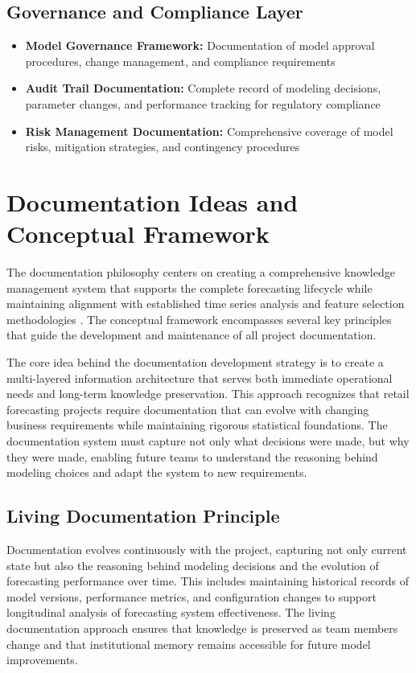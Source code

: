 \subsection{Governance and Compliance Layer}
\begin{itemize}
	\item \textbf{Model Governance Framework:} Documentation of model approval procedures, change management, and compliance requirements
	\item \textbf{Audit Trail Documentation:} Complete record of modeling decisions, parameter changes, and performance tracking for regulatory compliance
	\item \textbf{Risk Management Documentation:} Comprehensive coverage of model risks, mitigation strategies, and contingency procedures
\end{itemize}

\section{Documentation Ideas and Conceptual Framework}

The documentation philosophy centers on creating a comprehensive knowledge management system that supports the complete forecasting lifecycle while maintaining alignment with established time series analysis and feature selection methodologies \cite{Montgomery:2008}\cite{Guyon:2003}. The conceptual framework encompasses several key principles that guide the development and maintenance of all project documentation.

The core idea behind the documentation development strategy is to create a multi-layered information architecture that serves both immediate operational needs and long-term knowledge preservation. This approach recognizes that retail forecasting projects require documentation that can evolve with changing business requirements while maintaining rigorous statistical foundations. The documentation system must capture not only what decisions were made, but why they were made, enabling future teams to understand the reasoning behind modeling choices and adapt the system to new requirements.

\subsection{Living Documentation Principle}
Documentation evolves continuously with the project, capturing not only current state but also the reasoning behind modeling decisions and the evolution of forecasting performance over time. This includes maintaining historical records of model versions, performance metrics, and configuration changes to support longitudinal analysis of forecasting system effectiveness. The living documentation approach ensures that knowledge is preserved as team members change and that institutional memory remains accessible for future model improvements.

